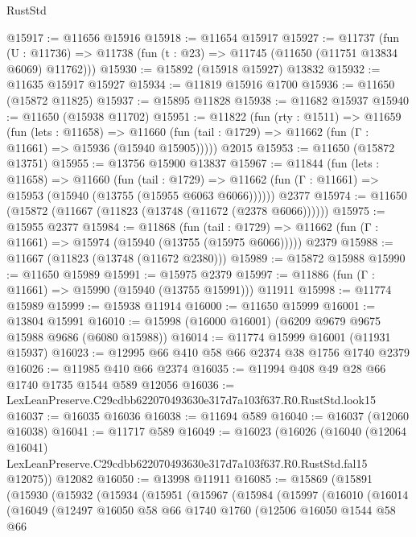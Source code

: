 \begin{lexlean}{RustStd}
\begin{coremodule}
@15917 := @11656 @15916
@15918 := @11654 @15917
@15927 := @11737
    (fun (U : @11736) => @11738 (fun (t : @23) => @11745 (@11650 (@11751 @13834 @6069) @11762)))
@15930 := @15892 (@15918 @15927) @13832
@15932 := @11635 @15917 @15927
@15934 := @11819 @15916 @1700
@15936 := @11650 (@15872 @11825)
@15937 := @15895 @11828
@15938 := @11682 @15937
@15940 := @11650 (@15938 @11702)
@15951 := @11822
    (fun (rty : @1511) =>
    @11659
      (fun (lets : @11658) =>
      @11660 (fun (tail : @1729) => @11662 (fun (Γ : @11661) => @15936 (@15940 @15905)))))
    @2015
@15953 := @11650 (@15872 @13751)
@15955 := @13756 @15900 @13837
@15967 := @11844
    (fun (lets : @11658) =>
    @11660
      (fun (tail : @1729) =>
      @11662 (fun (Γ : @11661) => @15953 (@15940 (@13755 (@15955 @6063 @6066))))))
    @2377
@15974 := @11650 (@15872 (@11667 (@11823 (@13748 (@11672 (@2378 @6066))))))
@15975 := @15955 @2377
@15984 := @11868
    (fun (tail : @1729) => @11662 (fun (Γ : @11661) => @15974 (@15940 (@13755 (@15975 @6066)))))
    @2379
@15988 := @11667 (@11823 (@13748 (@11672 @2380)))
@15989 := @15872 @15988
@15990 := @11650 @15989
@15991 := @15975 @2379
@15997 := @11886 (fun (Γ : @11661) => @15990 (@15940 (@13755 @15991))) @11911
@15998 := @11774 @15989
@15999 := @15938 @11914
@16000 := @11650 @15999
@16001 := @13804 @15991
@16010 := @15998 (@16000 @16001) (@6209 @9679 @9675 @15988 @9686 (@6080 @15988))
@16014 := @11774 @15999 @16001 (@11931 @15937)
@16023 := @12995 @66 @410 @58 @66 @2374 @38 @1756 @1740 @2379
@16026 := @11985 @410 @66 @2374
@16035 := @11994 @408 @49 @28 @66 @1740 @1735 @1544 @589 @12056
@16036 := LexLeanPreserve.C29cdbb622070493630e317d7a103f637.R0.RustStd.look15
@16037 := @16035 @16036
@16038 := @11694 @589
@16040 := @16037 (@12060 @16038)
@16041 := @11717 @589
@16049 := @16023
    (@16026
      (@16040
        (@12064 @16041)
        LexLeanPreserve.C29cdbb622070493630e317d7a103f637.R0.RustStd.fal15
        @12075))
    @12082
@16050 := @13998 @11911
@16085 := @15869
    (@15891
      (@15930
        (@15932
          (@15934
            (@15951
              (@15967
                (@15984
                  (@15997
                    (@16010
                      (@16014
                        (@16049
                          (@12497
                            @16050
                            @58
                            @66
                            @1740
                            @1760
                            (@12506
                              @16050
                              @1544
                              @58
                              @66

\end{coremodule}
\end{lexlean}
